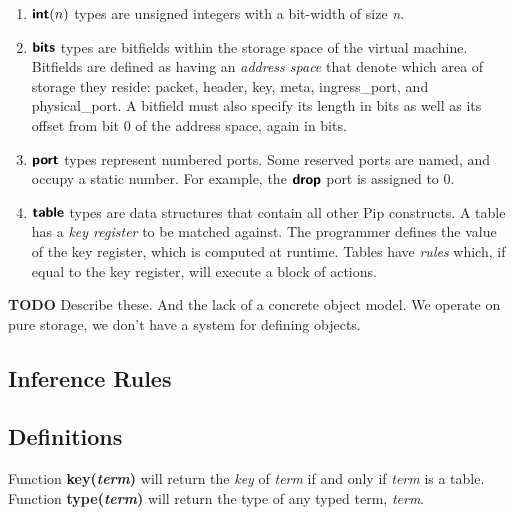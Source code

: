 \begin{enumerate}
\item $\bm{\mathsf{{int}}}(n)$ types are unsigned integers with a bit-width of size \textit{n}.
\item $\bm{\mathsf{{bits}}}$ types are bitfields within the storage space of the virtual machine. Bitfields are defined as having an \textit{address space} that denote which area of storage they reside: packet, header, key, meta, ingress\_port, and physical\_port. A bitfield must also specify its length in bits as well as its offset from bit 0 of the address space, again in bits.
\item $\bm{\mathsf{{port}}}$ types represent numbered ports. Some reserved ports are named, and occupy a static number. For example, the $\bm{\mathsf{{drop}}}$ port is assigned to 0.
\item $\bm{\mathsf{{table}}}$ types are data structures that contain all other Pip constructs. A table has a \textit{key register} to be matched against. The programmer defines the value of the key register, which is computed at runtime. Tables have \textit{rules} which, if equal to the key register, will execute a block of actions.
\end{enumerate}

\textbf{TODO} Describe these. And the lack of a concrete object model. We
operate on pure storage, we don't have a system for defining objects.

\subsection{Inference Rules}
\subsection*{Definitions}
Function \textbf{key(\textit{term})} will return the \textit{key} of \textit{term} if and only if \textit{term} is a table. \newline
Function \textbf{type(\textit{term})} will return the type of any typed term, \textit{term}.

